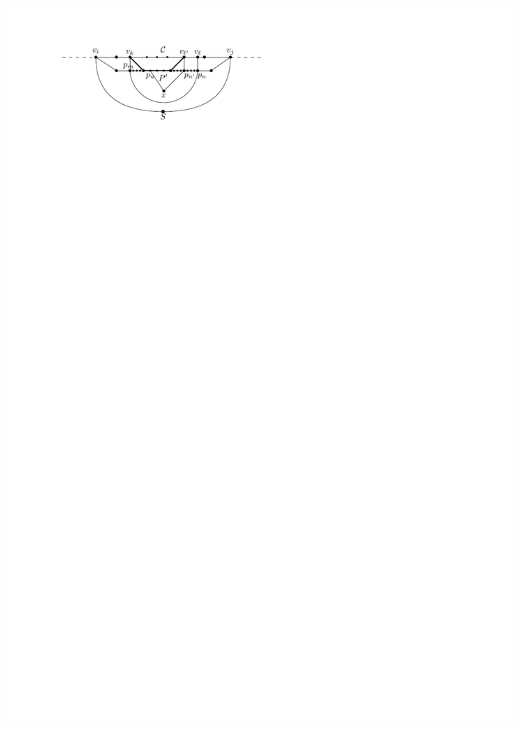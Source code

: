 \documentclass[a4paper]{article}
\begin{document}
\includegraphics[scale=1]{unifiedAlgo/img/sweep/cases/2chordInChordUpdate}
\clearpage%
\end{document}
